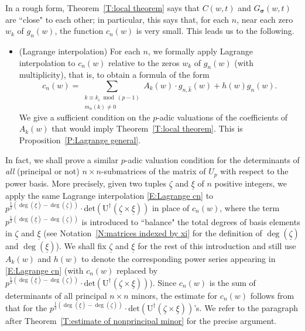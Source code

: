 \documentclass[12pt]{amsart}
\theoremstyle{definition}
\numberwithin{equation}{subsection}
\def\rmU{\mathrm{U}}
\newcommand{\bbsigma}{\boldsymbol{\sigma}}
\renewcommand{\det}{\mathrm{det}}
\begin{document}
In a rough form, Theorem~\ref{T:local theorem} says that $C(w, t)$ and $G_{\bbsigma}(w,t)$ are ``close" to each other; in particular, this says that, for each $n$, near each zero $w_k$ of $g_n(w)$, the function $c_n(w)$ is very small.  This leads us to the following.
\begin{itemize}
\item [\underline{Step I}:] (Lagrange interpolation) For each $n$, we formally apply Lagrange interpolation to $c_n(w)$ relative to the zeros $w_k$ of $g_n(w)$ (with multiplicity), that is, to obtain a formula of the form
\begin{equation}
\label{E:Lagrange cn}
c_n(w) = \sum_{\substack{k \equiv k_\varepsilon \bmod (p-1) \\ m_n(k) \neq 0}} A_k(w) \cdot g_{n, \hat k}(w) + h(w) g_{n}(w).
\end{equation}
We give a sufficient condition  on the $p$-adic valuations of the coefficients of $A_k(w)$ that would imply Theorem~\ref{T:local theorem}.  This is Proposition~\ref{P:Lagrange general}.
\end{itemize}

In fact, we shall prove a similar $p$-adic valuation condition for the determinants of \emph{all} (principal or not) $n\times n$-submatrices of the matrix of $U_p$ with respect to the power basis. 
More precisely, given two tuples $\underline \zeta$ and $\underline \xi$ of $n$ positive integers,  we apply the same Lagrange interpolation \eqref{E:Lagrange cn} to $p^{\frac 12 (\deg(\underline \xi)-\deg(\underline\zeta))}\cdot \det(\rmU^\dagger(\underline \zeta \times \underline \xi))$ in place of $c_n(w)$, where the term $p^{\frac 12 (\deg(\underline \xi)-\deg(\underline\zeta))}$ is introduced to ``balance" the total degrees of basis elements in $\underline \zeta$ and $\underline \xi$ (see Notation~\ref{N:matrices indexed by xi} for the definition of $\deg(\underline \zeta)$ and $\deg(\underline \xi)$). We shall fix $\underline \zeta$ and $\underline \xi$ for the rest of this introduction and still use $A_k(w)$ and $h(w)$ to denote the corresponding power series appearing in \eqref{E:Lagrange cn} (with $c_n(w)$ replaced by $p^{\frac 12 (\deg(\underline \xi)-\deg(\underline\zeta))}\cdot\det(\rmU^\dagger(\underline \zeta \times \underline \xi))$). Since $c_n(w)$ is the sum of determinants of all principal $n\times n$ minors, the estimate for $c_n(w)$ follows from that for the $p^{\frac 12 (\deg(\underline \xi)-\deg(\underline \zeta))}\cdot\det(\rmU^\dagger(\underline \zeta \times \underline \xi))$'s. We refer to the paragraph after Theorem~\ref{T:estimate of nonprincipal minor} for the precise argument. 
\end{document}
